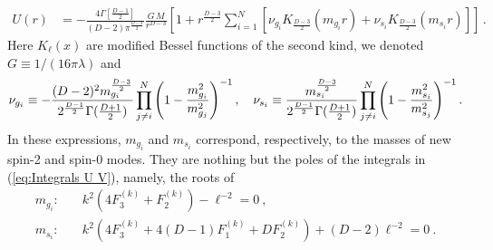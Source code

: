 \documentclass[11pt]{article}
\newcommand{\rmi}{\mathrm i}
\newcommand{\rme}{\mathrm e}
\newcommand{\rmd}{\mathrm d}
\begin{document}
\begin{equation}\label{eq:U(r) Power law}
\begin{aligned}
U(r)&=-\frac{4 \Gamma[\frac{D-1}{2}]}{(D-2)  \pi^{\frac{D-3}{2}}}  \frac{G\,M}{r^{D-3}}  \left[1+r^{\frac{D-3}{2}}\sum_{i=1}^N\left[\nu_{g_{i}}K_{\frac{D-3}{2}}(m_{g_i} r)+\nu_{s_{i}}K_{\frac{D-3}{2}}(m_{s_i} r) \right]\right]\,.
\end{aligned}
\end{equation}
Here $K_{\ell}(x)$ are modified Bessel functions of the second kind, we denoted $G \equiv 1/(16\pi \lambda)$ and 
\begin{align}
    \nu_{g_{i}}\equiv-\frac{(D-2)^2m_{g_i}^{\frac{D-3}{2}}}{2^{\frac{D-1}{2}}\Gamma(\tfrac{D+1}{2})}\prod_{j\neq i}^N\qty(1-\frac{m_{g_i}^2}{m_{g_j}^2})^{-1}\, , \quad
    \nu_{s_{i}}\equiv\frac{m_{s_i}^{\frac{D-3}{2}}}{2^{\frac{D-1}{2}}\Gamma(\tfrac{D+1}{2})}\prod_{j\neq i}^N\qty(1-\frac{m_{s_i}^2}{m_{s_j}^2})^{-1}\, .
\end{align}
In these expressions, $m_{g_i}$ and $m_{s_i}$ correspond, respectively, to the masses of new spin-2 and spin-0 modes. They are nothing but the poles 
of the integrals in (\ref{eq:Integrals U V}), %
namely, the roots of
\begin{align}
m_{g_i}:\quad &k^2 (4F_3^{(k)}+F_2^{(k)})-\ell^{-2}=0~,\label{eq:m_gi}\\
m_{s_i}:\quad &k^2 (4F_3^{(k)}+4 (D-1)F_1^{(k)} +DF_2^{(k)})+(D-2)\ell^{-2}=0~.\label{eq:m_si}
\end{align}
\end{document}

